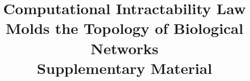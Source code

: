 
\title {{\Large Computational Intractability Law Molds the Topology of Biological  Networks} \\ {\Large{\textbf{Supplementary Material}}}}




\date{}



\maketitle
\begin{comment}
\tableofcontents
{%
    \color{white}
         \cite{rolland_proteome-scale_2014, yang_widespread_2016, barabasi_emergence_1999, fell_small_2000, arita_metabolic_2004, tanaka_protein_2005, fox_keller_revisiting_2005, khanin_how_2006, stelling_robustness_2004, hahn_molecular_2004, albert_error_2000, barabasi_network_2004, stumpf_critical_2012, alderson_contrasting_2010, papp_critical_2009, lynch_evolution_2007, sorrells_making_2015, aaronson_limits_2004, aaronson_guest_2005, fortnow_status_2009, vazirani_approximation_2013, lawler_fast_1979, wigderson_opening_2014, carvunis_proto-genes_2012, vinayagam_integrating_2014, pisinger_core_1999-1, pisinger_where_2005, costanzo_global_2016, livnat_analytical_2011, chastain_algorithms_2014, livnat_sex_2016, brenner_turing_2012, gerstein_architecture_2012, khurana_interpretation_2013, kim_positive_2007, mitra_integrative_2013}
}
\end{comment}
